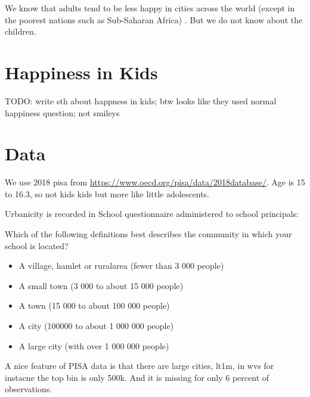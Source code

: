 \documentclass[10pt, letterpaper]{article}
\newcommand{\emd}[1]{\ExecuteMetaData[/tmp/tex]{#1}} %
\begin{document}
\begin{spacing}{1.4} %





We know that adults tend to be less happy in cities across the world (except in
the poorest nations such as Sub-Saharan Africa) \citep{aok21}. But we do not
know about the children. 

\section{Happiness in Kids}

TODO: write sth about happness in kids; btw looks like they used normal happiness question; not smileys


\section{Data}

We use 2018 pisa from \url{https://www.oecd.org/pisa/data/2018database/}. Age is 15 to 16.3, so not kids kids but more like
little adolescents.

Urbanicity is recorded in  School questionnaire administered to school
principals:

Which of the following definitions best describes the community in which your school is located?
\begin{itemize}
\item A village, hamlet or ruralarea (fewer than 3 000 people)
\item A small town (3 000 to about 15 000 people)
\item A town (15 000 to about 100 000 people)
\item A city (100000 to about 1 000 000 people)
\item A large city (with over 1 000 000 people)
\end{itemize}

A nice feature of PISA data is that there are large cities, lt1m, in wvs for
instacne the top bin is only 500k. And it is missing for only 6 percent of
observations. 


\end{spacing}
\end{document}
